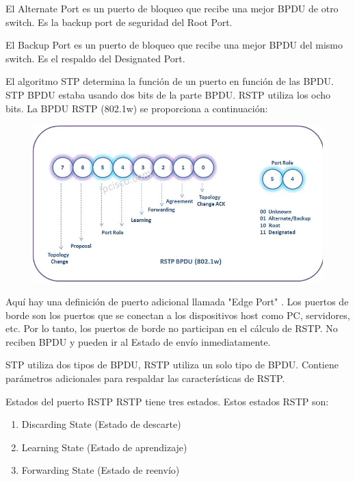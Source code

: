 \documentclass[a4paper]{article}
\begin{document}
\begin{enumerate}
El Alternate Port es un puerto de bloqueo que recibe una mejor BPDU de otro switch. Es la backup port de seguridad del Root Port.

El Backup Port es un puerto de bloqueo que recibe una mejor BPDU del mismo switch. Es el respaldo del Designated Port.

El algoritmo STP determina la función de un puerto en función de las BPDU. STP BPDU estaba usando dos bits de la parte BPDU. RSTP utiliza los ocho bits. La BPDU RSTP (802.1w) se proporciona a continuación:
\begin{figure}[h]
	\centering
	\includegraphics[width=0.7\linewidth]{screenshot001}
	\caption{}
	\label{fig:screenshot001}
\end{figure}
Aquí hay una definición de puerto adicional llamada "Edge Port" . Los puertos de borde son los puertos que se conectan a los dispositivos host como PC, servidores, etc. Por lo tanto, los puertos de borde no participan en el cálculo de RSTP. No reciben BPDU y pueden ir al Estado de envío inmediatamente.

STP utiliza dos tipos de BPDU, RSTP utiliza un solo tipo de BPDU. Contiene parámetros adicionales para respaldar las características de RSTP.

Estados del puerto RSTP
RSTP tiene tres estados. Estos estados RSTP son:
\begin{enumerate}
	\item Discarding State (Estado de descarte)
	\item Learning State (Estado de aprendizaje)
	\item Forwarding State (Estado de reenvío)
\end{enumerate}


\end{enumerate}
\end{document}
